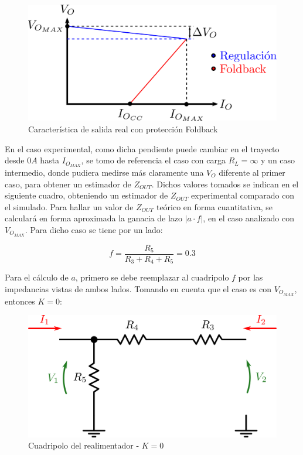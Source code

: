 \begin{figure}[!ht]
\begin{centering}
\includegraphics[scale=0.5]{Imagenes/FB_Real.png}
\par\end{centering}
\caption{Caracter\'istica de salida real con protecci\'on Foldback}

\end{figure}

En el caso experimental, como dicha pendiente puede cambiar en el trayecto desde $0A$ hasta $I_{O_{MAX}}$, se tomo de referencia el caso con carga $R_L = \infty$ y un caso intermedio, donde pudiera medirse m\'as claramente una $V_O$ diferente al primer caso, para obtener un estimador de $Z_{OUT}$. Dichos valores tomados se indican en el siguiente cuadro, obteniendo un estimador de $Z_{OUT}$ experimental comparado con el simulado.
Para hallar un valor de $Z_{OUT}$ te\'orico en forma cuantitativa, se calcular\'a en forma aproximada la ganacia de lazo $|a \cdot f|$, en el caso analizado con $V_{O_{MAX}}$. Para dicho caso se tiene por un lado:

\[
f = \frac{R_5}{R_3 + R_4 + R_5} = 0.3
\]

Para el c\'alculo de $a$, primero se debe reemplazar al cuadripolo $f$ por las impedancias vistas de ambos lados. Tomando en cuenta que el caso es con $V_{O_{MAX}}$, entonces $K=0$:

\begin{figure}[!ht]
\begin{centering}
\includegraphics[scale=0.5]{Imagenes/CuadripoloF_K0.png}
\par\end{centering}
\caption{Cuadripolo del realimentador - $K = 0$}

\end{figure}

